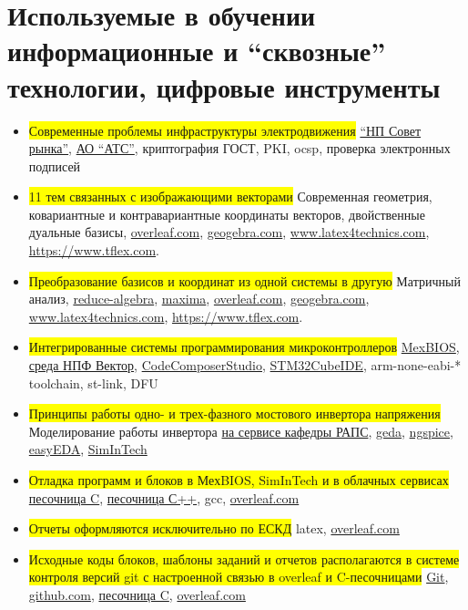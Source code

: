 \newpage
\section{Используемые в обучении информационные и \enquote{сквозные} технологии, цифровые инструменты}
\begin{itemize}
\item\colorbox{yellow}{Современные проблемы инфраструктуры электродвижения} \href{https://www.np-sr.ru/}{\enquote{НП Совет рынка}}, \href{https://www.atsenergo.ru}{АО \enquote{АТС}}, криптография ГОСТ, PKI, ocsp, проверка электронных подписей
\item\colorbox{yellow}{11 тем связанных с изображающими векторами} Современная геометрия, ковариантные и контравариантные координаты векторов, двойственные дуальные базисы, \url{overleaf.com}, \url{geogebra.com}, \url{www.latex4technics.com}, \url{https://www.tflex.com}.
\item\colorbox{yellow}{Преобразование базисов и координат из одной системы в другую} Матричный анализ, \href{http://www.reduce-algebra.com/}{reduce-algebra}, \href{https://maxima.sourceforge.io/ru/}{maxima}, \url{overleaf.com}, \url{geogebra.com}, \url{www.latex4technics.com}, \url{https://www.tflex.com}.
\item\colorbox{yellow}{Интегрированные системы программирования микроконтроллеров} \href{https://mechatronica-pro.com/ru}{MexBIOS}, \href{http://motorcontrol.ru}{среда НПФ Вектор}, \href{ti.com}{CodeComposerStudio}, \href{st.com}{STM32CubeIDE}, arm-none-eabi-* toolchain, st-link, DFU

\item\colorbox{yellow}{Принципы работы одно- и трех-фазного мостового инвертора напряжения} Моделирование работы инвертора
\href{http://www.raps-lab.eltech.ru/cgi-bin/circuit.pl}{на сервисе кафедры РАПС},
\href{http://www.geda-project.org/}{geda}, \href{http://ngspice.sourceforge.net/}{ngspice}, \href{easygeda.com}{easyEDA}, \href{https://simintech.ru/}{SimInTech}
\item\colorbox{yellow}{Отладка программ и блоков в МехBIOS, SimInTech и в облачных сервисах} \href{https://www.mycompiler.io/new/c}{песочница C},
\href{http://cpp.sh/}{песочница С++}, gcc, \url{overleaf.com}
\item\colorbox{yellow}{Отчеты оформляются исключительно по ЕСКД}  latex, \url{overleaf.com}
\item\colorbox{yellow}{Исходные коды блоков, шаблоны заданий и отчетов располагаются в системе контроля версий git с настроенной связью в overleaf и C-песочницами} \href{https://git-scm.com}{Git}, \href{https://github.com/trot-t}{github.com}, \href{https://www.mycompiler.io/new/c}{песочница C}, \url{overleaf.com}
\end{itemize}

